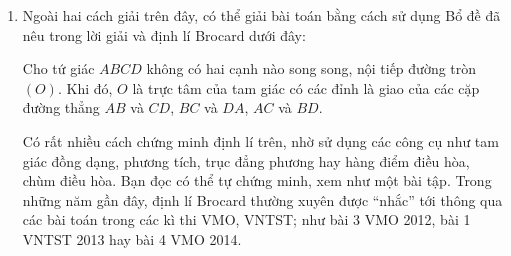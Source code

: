 \begin{bt}
{\begin{nx}
\begin{enumerate}
			\item  Ngoài hai cách giải trên đây, có thể giải bài toán bằng cách sử dụng Bổ đề đã nêu trong lời giải và định lí Brocard dưới đây:
			\begin{dl} Cho tứ giác $ABCD$ không có hai cạnh nào song song, nội tiếp đường tròn $(O)$. Khi đó, $O$ là trực tâm của tam giác có các đỉnh là giao của các cặp đường thẳng $AB$ và $CD$, $BC$ và $DA$, $AC$ và $BD$.
			\end{dl}
			Có rất nhiều cách chứng minh định lí trên, nhờ sử dụng các công cụ như tam giác đồng dạng, phương tích, trục đẳng phương hay hàng điểm điều hòa, chùm điều hòa. Bạn đọc có thể tự chứng minh, xem như một bài tập.
			Trong những năm gần đây, định lí Brocard thường xuyên được ``nhắc'' tới thông qua các bài toán trong các kì thi VMO, VNTST; như bài 3 VMO 2012, bài 1 VNTST 2013 hay bài 4 VMO 2014.
\end{enumerate}
		\end{nx}
	}
\end{bt}


